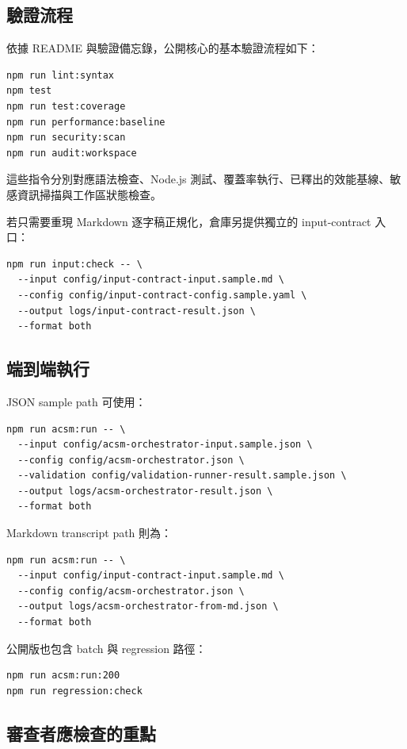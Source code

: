 \documentclass[11pt,a4paper]{article}
\begin{document}
\subsection{驗證流程}

依據 README 與驗證備忘錄，公開核心的基本驗證流程如下：

\begin{verbatim}
npm run lint:syntax
npm test
npm run test:coverage
npm run performance:baseline
npm run security:scan
npm run audit:workspace
\end{verbatim}

這些指令分別對應語法檢查、Node.js 測試、覆蓋率執行、已釋出的效能基線、敏感資訊掃描與工作區狀態檢查。

若只需要重現 Markdown 逐字稿正規化，倉庫另提供獨立的 input-contract 入口：

\begin{verbatim}
npm run input:check -- \
  --input config/input-contract-input.sample.md \
  --config config/input-contract-config.sample.yaml \
  --output logs/input-contract-result.json \
  --format both
\end{verbatim}

\subsection{端到端執行}

JSON sample path 可使用：

\begin{verbatim}
npm run acsm:run -- \
  --input config/acsm-orchestrator-input.sample.json \
  --config config/acsm-orchestrator.json \
  --validation config/validation-runner-result.sample.json \
  --output logs/acsm-orchestrator-result.json \
  --format both
\end{verbatim}

Markdown transcript path 則為：

\begin{verbatim}
npm run acsm:run -- \
  --input config/input-contract-input.sample.md \
  --config config/acsm-orchestrator.json \
  --output logs/acsm-orchestrator-from-md.json \
  --format both
\end{verbatim}

公開版也包含 batch 與 regression 路徑：

\begin{verbatim}
npm run acsm:run:200
npm run regression:check
\end{verbatim}

\subsection{審查者應檢查的重點}
\end{document}
